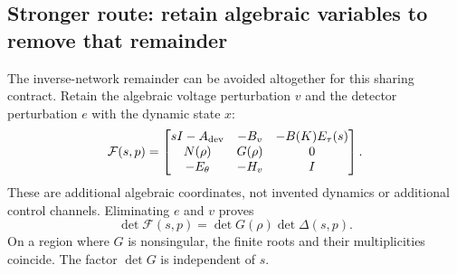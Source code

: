 \subsection{Stronger route: retain algebraic variables to remove that remainder}
\label{sec:affinelift}
The inverse-network remainder can be avoided altogether for this
sharing contract. Retain the algebraic voltage perturbation $v$ and
the detector perturbation $e$ with the dynamic state $x$:
\begin{equation}
 \mathcal F(s,p)=
 \begin{bmatrix}
 sI-A_{\rm dev}&-B_v&-B(K)E_\tau(s)\\
 N(\rho)&G(\rho)&0\\
 -E_\theta&-H_v&I
 \end{bmatrix}. \label{eq:affineDAE}
\end{equation}
These are additional algebraic coordinates, not invented dynamics
or additional control channels. Eliminating $e$ and $v$ proves
\begin{equation}
 \det\mathcal F(s,p)=\det G(\rho)\det\Delta(s,p).
 \label{eq:descriptor-equivalence}
\end{equation}
On a region where $G$ is nonsingular, the finite roots and their
multiplicities coincide. The factor $\det G$ is independent of $s$.

